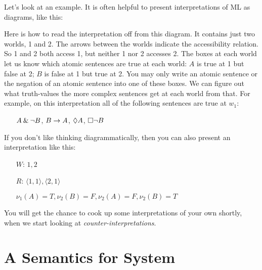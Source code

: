 Let's look at an example. It is often helpful to present interpretations of ML as diagrams, like this:
\begin{center}
\end{center}
Here is how to read the interpretation off from this diagram. It contains just two worlds, 1 and 2. The arrows between the worlds indicate the accessibility relation. So 1 and 2 both access 1, but neither 1 nor 2 accesses 2. The boxes at each world let us know which atomic sentences are true at each world: $A$ is true at 1 but false at 2; $B$ is false at 1 but true at 2. You may only write an atomic sentence or the negation of an atomic sentence into one of these boxes. We can figure out what truth-values the more complex sentences get at each world from that. For example, on this interpretation all of the following sentences are true at $w_1$:
\begin{itemize}
	\item[]$A\mathbin{\&}\neg B$, $B\rightarrow A$, $\Diamond A$, $\Box\neg B$
\end{itemize}
If you don't like thinking diagrammatically, then you can also present an interpretation like this:
\begin{itemize}
	\item[$W$:]$1,2$
	\item[$R$:]$\langle 1,1\rangle, \langle 2,1\rangle$
	\item[]$\nu_{1}(A)=T, \nu_{2}(B)=F, \nu_{2}(A)=F, \nu_{2}(B)=T$
\end{itemize}
You will get the chance to cook up some interpretations of your own shortly, when we start looking at \emph{counter-interpretations}.

\section{A Semantics for System \mlK}
\label{SemanticsK}

